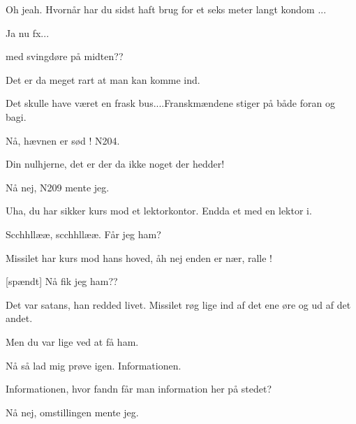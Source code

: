 \documentclass[a4paper,11pt]{article}
\begin{document}
\begin{sketch}
 Oh jeah. Hvornår har du sidst haft brug for et seks meter langt kondom
...

 Ja nu fx...

 med svingdøre på midten??

 Det er da meget rart at man kan komme ind.

 Det skulle have været en frask bus....Franskmændene stiger på både
foran og bagi.

 Nå, hævnen er sød ! N204.

 Din nulhjerne, det er der da ikke noget der hedder!

 Nå nej, N209 mente jeg.

 Uha, du har sikker kurs mod et lektorkontor. Endda et med en lektor i.

 Scchhllææ, scchhllææ. Får jeg ham?

 Missilet har kurs mod hans hoved, åh nej enden er nær, ralle !


[spændt] Nå fik jeg ham??

 Det var satans, han redded livet. Missilet røg lige ind af det ene øre
og ud af det andet.

 

 Men du var lige ved at få ham.

 Nå så lad mig prøve igen. Informationen.

 Informationen, hvor fandn får man information her på stedet?

 Nå nej, omstillingen mente jeg.

\end{sketch}
\end{document}
